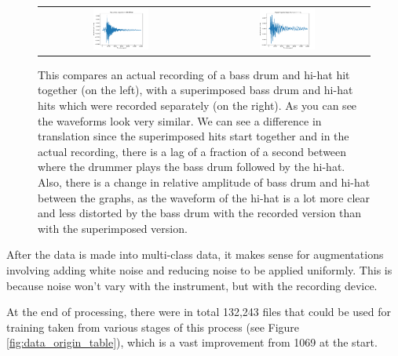 \documentclass[12pt]{article}
\begin{document}
    \begin{figure}[H]
        \centering
        \begin{tabular}{cc}
            \includegraphics[width=0.35\textwidth]{figures/recorded_bd_hh.pdf}&
            \includegraphics[width=0.35\textwidth]{figures/superimposed_bd_hh.pdf}\\
        \end{tabular}
    \caption{\footnotesize{This compares an actual recording of a bass drum and hi-hat hit together (on the left), with a superimposed bass drum and hi-hat hits which were recorded separately (on the right). As you can see the waveforms look very similar. We can see a difference in translation since the superimposed hits start together and in the actual recording, there is a lag of a fraction of a second between where the drummer plays the bass drum followed by the hi-hat. Also, there is a change in relative amplitude of bass drum and hi-hat between the graphs, as the waveform of the hi-hat is a lot more clear and less distorted by the bass drum with the recorded version than with the superimposed version.}}
    \label{fig:synthetic_vs_real}
    \end{figure}
    
    After the data is made into multi-class data, it makes sense for augmentations involving adding white noise and reducing noise to be applied uniformly. This is because noise won't vary with the instrument, but with the recording device.\medskip
    
    At the end of processing, there were in total 132,243 files that could be used for training taken from various stages of this process (see Figure \ref{fig:data_origin_table}), which is a vast improvement from 1069 at the start.\medskip
    
\end{document}
